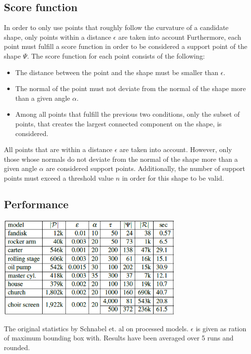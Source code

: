 \subsection{Score function}
In order to only use points that roughly follow the curvature of a candidate shape, only points within a distance $\epsilon$ are taken into account Furthermore, each point must fulfill a score function in order to be considered a support point of the shape $\Psi$. 
The score function for each point consists of the following: 
\begin{itemize}
	\item The distance between the point and the shape must be smaller than $\epsilon$.
	\item The normal of the point must not deviate from the normal of the shape more than a given angle $\alpha$.
	\item Among all points that fulfill the previous two conditions, only the subset of points, that creates the largest connected component on the shape,  is considered.
\end{itemize}

All points that are within a distance $\epsilon$ are taken into account. However, only those whose normals do not deviate from the normal of the shape more than a given angle $\alpha$ are considered support points. Additionally, the number of support points must exceed a threshold value $n$ in order for this shape to be valid. 


\subsection{Performance}
\begin{table}
	\centering
	\includegraphics[width=0.7\textwidth]{Shape_Detection/schnabel-performance.png}
	\caption{The original statistics by Schnabel et. al\cite{schnabel-2007-efficient} on processed models. $\epsilon$ is given as ration of maximum bounding box with. Results have been averaged over 5 runs and rounded.}
	\label{table:schnabel_performance}
\end{table}

